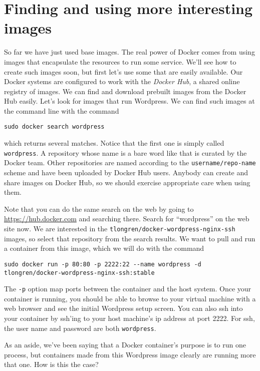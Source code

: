 \documentclass{article}
\begin{document}
\section{Finding and using more interesting images}
So far we have just used base images.  The real power of Docker comes from using images that encapsulate the resources to run some service.  We'll see how to create such images soon, but first let's use some that are easily available.  Our Docker systems are configured to work with the \emph{Docker Hub}, a shared online registry of images.  We can find and download prebuilt images from the Docker Hub easily.  Let's look for images that run Wordpress.  We can find such images at the command line with the command

\texttt{sudo docker search wordpress}

which returns several matches.  Notice that the first one is simply called \texttt{wordpress}.  A repository whose name is a bare word like that is curated by the Docker team.  Other repositories are named according to the \texttt{username/repo-name} scheme and have been uploaded by Docker Hub users. Anybody can create and share images on Docker Hub, so we should exercise appropriate care when using them.

Note that you can do the same search on the web by going to \url{https://hub.docker.com} and searching there.  Search for ``wordpress'' on the web site now.  We are interested in the \texttt{tlongren/docker-wordpress-nginx-ssh} images, so select that repository from the search results.  We want to pull and run a container from this image, which we will do with the command
\begin{verbatim}
sudo docker run -p 80:80 -p 2222:22 --name wordpress -d tlongren/docker-wordpress-nginx-ssh:stable
\end{verbatim}

The \texttt{-p} option map ports between the container and the host system. Once your container is running, you should be able to browse to your virtual machine with a web browser and see the initial Wordpress setup screen.  You can also ssh into your container by ssh'ing to your host machine's ip address at port 2222.  For ssh, the user name and password are both \texttt{wordpress}.

As an aside, we've been saying that a Docker container's purpose is to run one process, but containers made from this Wordpress image clearly are running more that one. How is this the case? 
\end{document}
